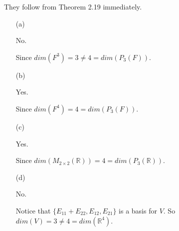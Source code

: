 \begin{Exercise}
They follow from Theorem 2.19 immediately.
\begin{enumerate}[(a)]
\item[(a)]
\begin{answer}
No.
\end{answer}
\begin{solution}
Since $dim(F^3) = 3 \neq 4 = dim(P_3(F))$.
\end{solution}

\item[(b)]
\begin{answer}
Yes.
\end{answer}
\begin{solution}
Since $dim(F^4) = 4 = dim(P_3(F))$.
\end{solution}

\item[(c)]
\begin{answer}
Yes.
\end{answer}
\begin{solution}
Since $dim(M_{2\times 2}(\mathbb{R})) = 4 = dim(P_3(\mathbb{R}))$.
\end{solution}

\item[(d)]
\begin{answer}
No.
\end{answer}
\begin{solution}
Notice that $\{E_{1 1}+E_{2 2}, E_{1 2}, E_{2 1}\}$ is a basis for $V$. So $dim(V) = 3 \neq 4 = dim(\mathbb{R}^4)$.
\end{solution}

\end{enumerate}
\end{Exercise}